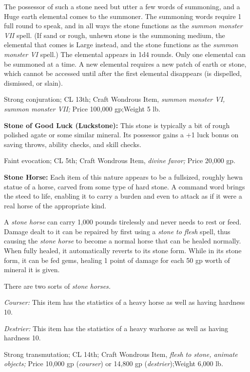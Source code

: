 \documentclass{article}
\begin{document}
The possessor of such a stone need but utter a few words of summoning, and a Huge 
earth elemental comes to the summoner. The summoning words require 1 full round 
to speak, and in all ways the stone functions as the \textit{summon monster VII 
}spell. (If sand or rough, unhewn stone is the summoning medium, the elemental 
that comes is Large instead, and the stone functions as the \textit{summon monster 
VI }spell.) The elemental appears in 1d4 rounds. Only one elemental can be summoned 
at a time. A new elemental requires a new patch of earth or stone, which cannot 
be accessed until after the first elemental disappears (is dispelled, dismissed, 
or slain).

Strong conjuration; CL 13th; Craft Wondrous Item, \textit{summon monster VI, summon 
monster VII; }Price 100,000 gp;Weight 5 lb.

\textbf{Stone of Good Luck (Luckstone):} This stone is typically a bit of rough 
polished agate or some similar mineral. Its possessor gains a +1 luck bonus on 
saving throws, ability checks, and skill checks.

Faint evocation; CL 5th; Craft Wondrous Item, \textit{divine favor; }Price 20,000 
gp.

\textbf{Stone Horse:} Each item of this nature appears to be a fullsized, roughly 
hewn statue of a horse, carved from some type of hard stone. A command word brings 
the steed to life, enabling it to carry a burden and even to attack as if it were 
a real horse of the appropriate kind.

A \textit{stone horse }can carry 1,000 pounds tirelessly and never needs to rest 
or feed. Damage dealt to it can be repaired by first using a \textit{stone to flesh 
}spell, thus causing the \textit{stone horse }to become a normal horse that can 
be healed normally. When fully healed, it automatically reverts to its stone form. 
While in its stone form, it can be fed gems, healing 1 point of damage for each 
50 gp worth of mineral it is given.

There are two sorts of \textit{stone horses.}

\textit{Courser: }This item has the statistics of a heavy horse as well as having 
hardness 10.

\textit{Destrier: }This item has the statistics of a heavy warhorse as well as 
having hardness 10.

Strong transmutation; CL 14th; Craft Wondrous Item, \textit{flesh to stone, animate 
objects; }Price 10,000 gp (\textit{courser}) or 14,800 gp (\textit{destrier});Weight 
6,000 lb.
\end{document}
